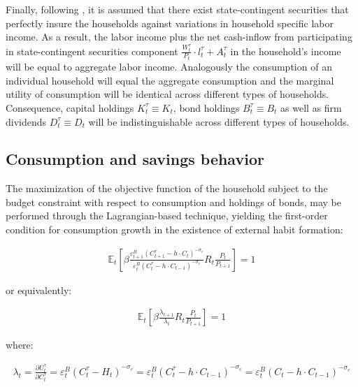 \documentclass{pracamgr}
\numberwithin{equation}{section}
\begin{document}
Finally, following \citet{christiano2005nominal}, it is assumed that there exist state-contingent securities that perfectly insure the households against variations in household specific labor income. As a result, the labor income plus the net cash-inflow from participating in state-contingent securities component $\frac{W_{t}^{\tau}}{P_{t}} \cdot l_{t}^{\tau} + A_{t}^{\tau}$ in the household's income will be equal to aggregate labor income. Analogously the consumption of an individual household will equal the aggregate consumption and the marginal utility of consumption will be identical across different types of households. Consequence, capital holdings $K_{t}^{\tau} \equiv K_{t}$, bond holdings $B_{t}^{\tau} \equiv B_{t}$ as well as firm dividends  $D_{t}^{\tau} \equiv D_{t}$ will be indistinguishable across different types of households.

\subsection{Consumption and savings behavior} \label{Consumption and savings behavior}

The maximization of the objective function of the household subject to the budget constraint with respect to consumption and holdings of bonds, may be performed through the Lagrangian-based technique, yielding the first-order condition for consumption growth in the existence of external habit formation:

\begin{align}
\mathbb{E}_{t} \left[ \beta \frac{\varepsilon_{t+1}^{B} (C_{t+1}^{\tau} - h \cdot C_{t} )^{-\sigma_{c}}}{\varepsilon_{t}^{B} (C_{t}^{\tau} - h \cdot C_{t-1} )^{-\sigma_{c}}} R_{t} \frac{P_{t}}{P_{t+1}} \right] = 1
\end{align}

or equivalently:

\begin{align}
\mathbb{E}_{t} \left[ \beta \frac{\lambda_{t+1}}{\lambda_{t}} R_{t} \frac{P_{t}}{P_{t+1}} \right] = 1
\end{align}

where:

\begin{align}
\lambda_{t} = \frac{\partial U_{t}^{\tau}}{\partial C_{t}^{\tau}} = \varepsilon_{t}^{B} (C_{t}^{\tau} - H_{t} )^{-\sigma_{c}} = \varepsilon_{t}^{B} (C_{t}^{\tau} - h \cdot C_{t-1} )^{-\sigma_{c}} = \varepsilon_{t}^{B} (C_{t} - h \cdot C_{t-1} )^{-\sigma_{c}}
\end{align}
\end{document}
